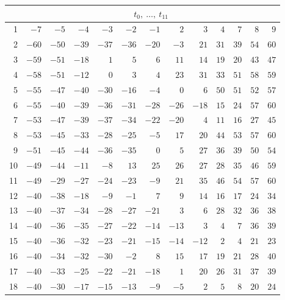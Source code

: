\documentclass[11pt]{amsart}
\theoremstyle{definition}
\theoremstyle{remark}
\begin{document}
\begin{table}[htbp]
\footnotesize
\setlength{\tabcolsep}{3.2pt}
\begin{tabular}{r|*{12}{r}}
\multicolumn{1}{c|}{} & \multicolumn{12}{c}{$t_0,\ \ldots,\ t_{11}$}\\
\hline
1 & $-7$ & $-5$ & $-4$ & $-3$ & $-2$ & $-1$ & $2$ & $3$ & $4$ & $7$ & $8$ & $9$ \\
2 & $-60$ & $-50$ & $-39$ & $-37$ & $-36$ & $-20$ & $-3$ & $21$ & $31$ & $39$ & $54$ & $60$ \\
3 & $-59$ & $-51$ & $-18$ & $1$ & $5$ & $6$ & $11$ & $14$ & $19$ & $20$ & $43$ & $47$ \\
4 & $-58$ & $-51$ & $-12$ & $0$ & $3$ & $4$ & $23$ & $31$ & $33$ & $51$ & $58$ & $59$ \\
5 & $-55$ & $-47$ & $-40$ & $-30$ & $-16$ & $-4$ & $0$ & $6$ & $50$ & $51$ & $52$ & $57$ \\
6 & $-55$ & $-40$ & $-39$ & $-36$ & $-31$ & $-28$ & $-26$ & $-18$ & $15$ & $24$ & $57$ & $60$ \\
7 & $-53$ & $-47$ & $-39$ & $-37$ & $-34$ & $-22$ & $-20$ & $4$ & $11$ & $16$ & $27$ & $45$ \\
8 & $-53$ & $-45$ & $-33$ & $-28$ & $-25$ & $-5$ & $17$ & $20$ & $44$ & $53$ & $57$ & $60$ \\
9 & $-51$ & $-45$ & $-44$ & $-36$ & $-35$ & $0$ & $5$ & $27$ & $36$ & $39$ & $50$ & $54$ \\
10 & $-49$ & $-44$ & $-11$ & $-8$ & $13$ & $25$ & $26$ & $27$ & $28$ & $35$ & $46$ & $59$ \\
11 & $-49$ & $-29$ & $-27$ & $-24$ & $-23$ & $-9$ & $21$ & $35$ & $46$ & $54$ & $57$ & $60$ \\
12 & $-40$ & $-38$ & $-18$ & $-9$ & $-1$ & $7$ & $9$ & $14$ & $16$ & $17$ & $24$ & $34$ \\
13 & $-40$ & $-37$ & $-34$ & $-28$ & $-27$ & $-21$ & $3$ & $6$ & $28$ & $32$ & $36$ & $38$ \\
14 & $-40$ & $-36$ & $-35$ & $-27$ & $-22$ & $-14$ & $-13$ & $3$ & $4$ & $7$ & $36$ & $39$ \\
15 & $-40$ & $-36$ & $-32$ & $-23$ & $-21$ & $-15$ & $-14$ & $-12$ & $2$ & $4$ & $21$ & $23$ \\
16 & $-40$ & $-34$ & $-32$ & $-30$ & $-2$ & $8$ & $15$ & $17$ & $19$ & $21$ & $28$ & $40$ \\
17 & $-40$ & $-33$ & $-25$ & $-22$ & $-21$ & $-18$ & $1$ & $20$ & $26$ & $31$ & $37$ & $39$ \\
18 & $-40$ & $-30$ & $-17$ & $-15$ & $-13$ & $-9$ & $-5$ & $2$ & $5$ & $8$ & $20$ & $24$ \\

\end{tabular}
\end{table}
\end{document}

